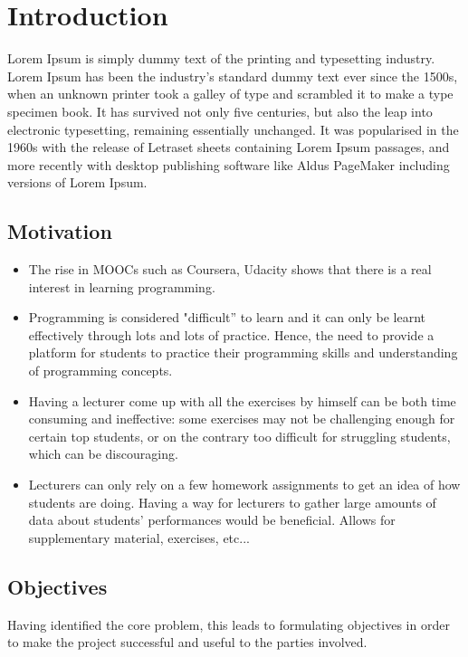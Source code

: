 \documentclass[11pt,a4paper]{report}
\begin{document}
%

\chapter{Introduction}

Lorem Ipsum is simply dummy text of the printing and typesetting industry. Lorem Ipsum has been the industry's standard dummy text ever since the 1500s, when an unknown printer took a galley of type and scrambled it to make a type specimen book. It has survived not only five centuries, but also the leap into electronic typesetting, remaining essentially unchanged. It was popularised in the 1960s with the release of Letraset sheets containing Lorem Ipsum passages, and more recently with desktop publishing software like Aldus PageMaker including versions of Lorem Ipsum.

\section{Motivation}


\begin{itemize}
\item The rise in MOOCs such as Coursera, Udacity shows that there is a real interest in learning programming.
\item Programming is considered "difficult'' to learn and it can only be learnt effectively through lots and lots of practice. Hence, the need to provide a platform for students to practice their programming skills and understanding of programming concepts.
\item Having a lecturer come up with all the exercises by himself can be both time consuming and ineffective: some exercises may not be challenging enough for certain top students, or on the contrary too difficult for struggling students, which can be discouraging.
\item Lecturers can only rely on a few homework assignments to get an idea of how students are doing. Having a way for lecturers to gather large amounts of data about students' performances would be beneficial. Allows for supplementary material, exercises, etc...
\end{itemize}

\section{Objectives}
Having identified the core problem, this leads to formulating objectives in order to make the project successful and useful to the parties involved. \newline
\end{document}
